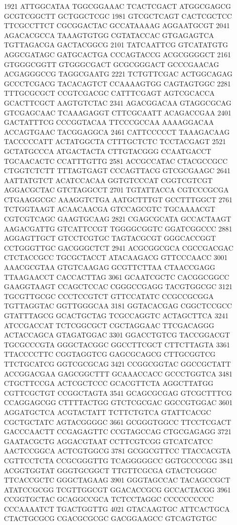 \begin{addmargin}{0.1\textwidth}
\begin{footnotesize}
\begin{LVerbatim}[commandchars=\\\{\}]
1921 ATTGGCATAA TGGCGGAAAC TCACTCGACT ATGGCGAGCG GCGTCGGCTT GCTGGCTCGC 
1981 GTCGCTCAGT CACTCGCTCC TTCGCCTTCT CGCGGACTAC GCCATAAAAG AGGAATGCGT 
2041 AGACACGCCA TAAAGTGTGG CGTATACCAC GTGAGAGTCA TGTTAGACGA GACTACGGCG 
2101 TATCAATTCG GTCATATGTG AGGCGATAGC GATGCACTGA CCCAGTACCG ACGCGGGGCT 
2161 GTGGGCGGTT GTGGGCGACT GCGCGGGACT GCCCGAACAG ACGAGGGCCG TAGGCGAATG 
2221 TCTGTTCGAC ACTGGCAGAG GCCCTCGACG TACACAGTCT CCAAAAGTGG CAGTAGTGGC 
2281 TTTGCGCGCT CCGTCGACGC CATTTCGAGT AGTCGCACCA GCACTTCGCT AAGTGTCTAC 
2341 AGACGGACAA GTAGGCGCAG GTCGAGCAAC TCAAAGAGGT CTTCGCAATT ACAGACCGAA 
2401 GACTATTTCG CCCGGTACAA TTCCCGCCAA AAAAGGACAA ACCAGTGAAC TACGGAGGCA 
2461 CATTCCCCCT TAAAGACAAG TACCCCCATT ACTATGGCTA CTTTGCTCTC TCCTACGAGT 
2521 GCTATGCCCA ATGACTACTA CTTGTACGGG CCAATGACCT TGCAACACTC CCATTTGTTG 
2581 ACCGCCATAC CTACGCCGCC CTGGTCTCTT TTTAGTGAGT CCCAGTTACG GTCGCGAAGC 
2641 AATTATGTCT ACATCCACAA GGTGTCCCAT CGGTCGTCGT AGGACGCTAC GTCTAGGCCT 
2701 TGTATTACCA CGTCCCGCGA CTGAAGGCGC AAAGGTCTGA AATGCTTTGT GCCTTTGGCT 
2761 TCTGGTAAGT ACAACAACGA GTCCAGCGTC TGCAAAACGT CGTCGTCAGC GAAGTGCAAG 
2821 CGAGCGCATA GCCACTAAGT AAGACGATTG GTCATTCCGT TGGGGCGGTC GGATCGGCCC 
2881 AGGAGTTGCT GTCCTCGTGC TAGTACGCGT GGGCACCGGT CCTGGGTTGC GACGGGCTCT 
2941 ACGCGGCGCA CGCCGACGAC CTCTACCGCC TGCGCTACCT ATACAAGACG GTTCCCAACC 
3001 AAACGCGTAA GTGTCAAGAG GCGTTCTTAA CTAACCGAGG TTAAGAACCT CACCACTTAG 
3061 GCAATCGCTC CACGGCGGCC GAAGGTAAGT CCAGCTCCAC CGGGCCGAGG TACGTGGCGC 
3121 TGCGTTGCGC CCCTCCGTCT GTTCCATATC CCGCCGCGGA TGTTAGGTAC GGTTGGGCAA 
3181 GGTACACGAG CGGCTCCGCC GTATTTAGCG GCACTGCTAG TCGCCAGGTC ACTAGCTTCA 
3241 ATCCGACCAT TCTCGGCGCT CGCTAGGAAC TTCGACAGGG ACTACCAGCA GTAGATGGAC 
3301 GGACCTGTCG TACCGGACGT TGCGCCCGTA GGGCTACGGC GGCCTTCGCT CTTCTTAGTA 
3361 TTACCCCTTC CGGTAGGTCG GAGCGCAGCG CTTGCGGTCG TTCTGCATCG GGTCGCGCAG 
3421 CCGGCGGTAC GGCCGCTATT ACCGGACGAA GAGCGGCTTT GCAAACCACC GCCCTGGTCA 
3481 CTGCTTCCGA ACTCGCTCCC GCACGTTCTA AGGCTTATGG CGTTCGCTGT CCGGCTAGTA 
3541 GCAGCGCGAG GTCGCTTTCG CCAGGAGCGG CTTTTACTGG GTCTCGCGAC GGCCGTGGAC 
3601 AGGATGCTCA ACGTACTATT TCTTCTGTCA GTATTCACGC CGCTGCTATC AGTACGGGGC 
3661 GCGGGTGGCC TTCCTCGACT GACCCAACTT CCGAGAGTTC CCGTAGCCAG CTGCGAGAGG 
3721 GAATACGCTG AGGACGTAAT CCTTCGTCGG GTCATCATCC AACTCCGGCA ACTCGTGGCG 
3781 GCGGCGTTCC TTACCACGTA CGTTCCTCTA CCGCGGGTTG TCAGGGGGCC GGTGCCCCGG 
3841 ACGGTGGTAT GGGTGCGGCT TTGTTCGCGA GTACTCGGGC TTCACCGCTC GGGCTAGAAG 
3901 GGGTAGCCAC TACAGCCGCT ATATCCGCGG TCGTTGGCGT GGACACCGCG GCCACTACGG 
3961 CCGGTGCTAC GCAGGCCGCA TCTCCTAGGC CCCCCCCCCC CCC\color{red}AAAATCT TGACTGGTTG 
\color{red}4021 GTACAAGTGC ATTCACTGCA CTACTGCGCG CGACGCGCGC GACGGAAGCC GTCAGTGTGC 

\end{LVerbatim}
\end{footnotesize}
\end{addmargin}
